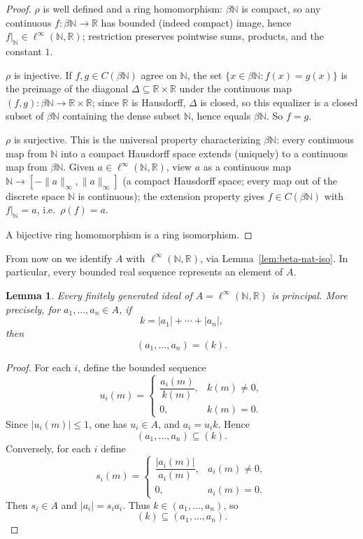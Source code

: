 \documentclass{amsart}
\newtheorem{lemma}[theorem]{Lemma}
\theoremstyle{definition}
\theoremstyle{remark}
\newcommand{\nat}{\mathbb N}
\newcommand{\reals}{\mathbb R}
\newcommand{\cont}[1]{C\left(#1\right)}
\newcommand{\linfty}{\ell^\infty}
\begin{document}
\begin{proof}
$\rho$ is well defined and a ring homomorphism: $\beta\nat$ is compact, so
any continuous $f:\beta\nat\to\reals$ has bounded (indeed compact) image,
hence $f|_\nat\in\linfty(\nat,\reals)$; restriction preserves pointwise
sums, products, and the constant $1$.

$\rho$ is injective. If $f,g\in\cont{\beta\nat}$ agree on $\nat$,
the set $\{x\in\beta\nat:f(x)=g(x)\}$ is the preimage of the diagonal
$\Delta\subseteq\reals\times\reals$ under the continuous map
$(f,g):\beta\nat\to\reals\times\reals$; since $\reals$ is Hausdorff,
$\Delta$ is closed, so this equalizer is a closed subset of $\beta\nat$
containing the dense subset $\nat$, hence equals $\beta\nat$. So $f=g$.

$\rho$ is surjective. This is the universal property characterizing
$\beta\nat$: every continuous map from $\nat$ into a compact Hausdorff
space extends (uniquely) to a continuous map from $\beta\nat$. Given
$a\in\linfty(\nat,\reals)$, view $a$ as a continuous map
$\nat\to[-\|a\|_\infty,\|a\|_\infty]$ (a compact Hausdorff space; every
map out of the discrete space $\nat$ is continuous); the extension
property gives $f\in\cont{\beta\nat}$ with $f|_\nat=a$, i.e.\
$\rho(f)=a$.

A bijective ring homomorphism is a ring isomorphism.
\end{proof}

From now on we identify $A$ with $\linfty(\nat,\reals)$, via
Lemma~\ref{lem:beta-nat-iso}. In particular, every bounded real sequence
represents an element of $A$.

\begin{lemma}\label{lem:bezout-linfty}
Every finitely generated ideal of $A=\linfty(\nat,\reals)$ is principal.
More precisely, for $a_1,\dots,a_n\in A$, if
\[
k=|a_1|+\cdots+|a_n|,
\]
then
\[
(a_1,\dots,a_n)=(k).
\]
\end{lemma}

\begin{proof}
For each $i$, define the bounded sequence
\[
u_i(m)=
\begin{cases}
\dfrac{a_i(m)}{k(m)},&k(m)\neq0,\\[1ex]
0,&k(m)=0.
\end{cases}
\]
Since $|u_i(m)|\leq1$, one has $u_i\in A$, and $a_i=u_i k$. Hence
\[
(a_1,\dots,a_n)\subseteq(k).
\]
Conversely, for each $i$ define
\[
s_i(m)=
\begin{cases}
\dfrac{|a_i(m)|}{a_i(m)},&a_i(m)\neq0,\\[1ex]
0,&a_i(m)=0.
\end{cases}
\]
Then $s_i\in A$ and $|a_i|=s_i a_i$. Thus $k\in(a_1,\dots,a_n)$, so
\[
(k)\subseteq(a_1,\dots,a_n).
\]
\end{proof}
\end{document}
